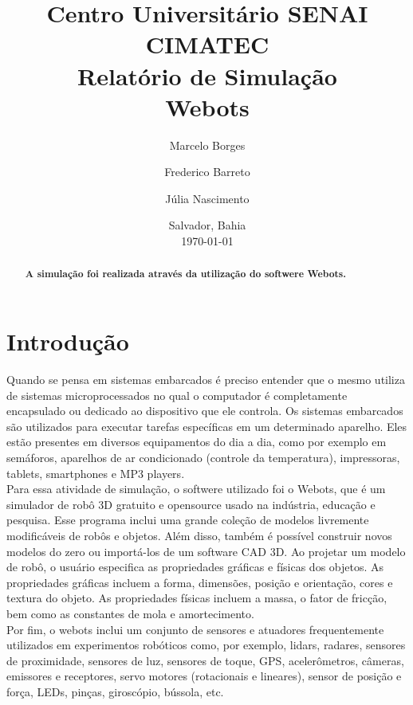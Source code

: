 \documentclass[11pt, a4paper, twocolumn]{article}
\begin{document}
\title{Centro Universitário SENAI CIMATEC\\
    \vspace{1cm}
    \textbf{Relatório de Simulação \\ Webots}
}

\author[1]{Marcelo Borges}
\author[2]{Frederico Barreto}
\author[3]{Júlia Nascimento}

\date{Salvador, Bahia\\\today}
\maketitle    
\begin{abstract}
    \textbf{A simulação foi realizada através da utilização do softwere Webots.}
\end{abstract}

\section{Introdução}
    Quando se pensa em sistemas embarcados é preciso entender que o mesmo utiliza de sistemas microprocessados no qual o computador é completamente 
    encapsulado ou dedicado ao dispositivo que ele controla. Os sistemas embarcados são utilizados para executar tarefas específicas em um determinado
    aparelho. Eles estão presentes em diversos equipamentos do dia a dia, como por exemplo em semáforos, aparelhos de ar condicionado (controle da temperatura),
    impressoras, tablets, smartphones e MP3 players.
    \\
    Para essa atividade de simulação, o softwere utilizado foi o Webots, que é um simulador de robô 3D gratuito e opensource usado na indústria, educação e 
    pesquisa. Esse programa inclui uma grande coleção de modelos livremente modificáveis de robôs e objetos. Além disso, também é possível construir novos modelos do zero
    ou importá-los de um software CAD 3D. Ao projetar um modelo de robô, o usuário especifica  as propriedades gráficas e físicas dos objetos. As propriedades gráficas incluem 
    a forma, dimensões, posição e orientação, cores e textura do objeto. As propriedades físicas incluem a massa, o fator de fricção, bem como as constantes de mola e amortecimento. 
    \\
    Por fim, o webots inclui um conjunto de sensores e atuadores frequentemente utilizados em experimentos robóticos como, por exemplo, lidars, radares, sensores de proximidade, 
    sensores de luz, sensores de toque, GPS, acelerômetros, câmeras, emissores e receptores, servo motores (rotacionais e lineares), sensor de posição e força, LEDs, pinças, giroscópio, 
    bússola, etc.
\end{document}
